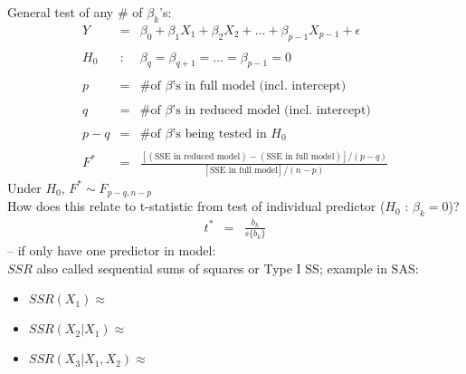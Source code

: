 \documentclass[12pt]{notes}
\begin{document}
General test of any \# of $\beta_k$'s:
\begin{eqnarray}
  Y & = & \beta_0 + \beta_1 X_1 + \beta_2 X_2 + \ldots + \beta_{p-1} X_{p-1} + \epsilon
  \nonumber \\
  & \nonumber \\
  H_0 & : & \beta_q = \beta_{q+1} = \ldots = \beta_{p-1} = 0   \nonumber \\
  & \nonumber \\
  p & = & \mbox{\# of $\beta$'s in full model (incl. intercept)} \nonumber\\
  & \nonumber \\
  q & = & \mbox{\# of $\beta$'s in reduced model (incl. intercept)} \nonumber\\
  & \nonumber \\
  p - q & = & \mbox{\# of $\beta$'s being tested in $H_0$} \nonumber \\
  & \nonumber \\
  F^* & = & \frac{[(\mbox{SSE in reduced model})-(\mbox{SSE in full model})] / (p-q)}{ [\mbox{SSE in full model}] /
  (n-p)} \nonumber
\end{eqnarray}
Under $H_0$, $F^* \sim F_{p-q,n-p}$\\


How does this relate to t-statistic from test of individual
predictor ($H_0$ : $\beta_k = 0$)?
\begin{eqnarray}
   t^* & = & \frac{b_k}{s\{ b_k \}} \nonumber
\end{eqnarray}
-- if only have one predictor in model:\\


$SSR$ also called sequential sums of squares or Type I SS; example
in SAS:
\begin{itemize}
  \item $SSR(X_1) \approx$
  \item $SSR(X_2 | X_1) \approx$
  \item $SSR(X_3 | X_1, X_2) \approx$
\end{itemize}

\vspace{.5em}
\end{document}
